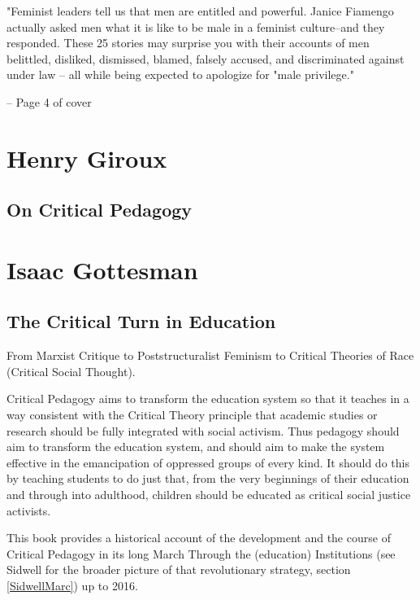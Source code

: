 \documentclass[10pt,titlepage]{book}
\begin{document}
"Feminist leaders tell us that men are entitled and powerful. Janice Fiamengo actually asked men what it is like to be male in a feminist culture--and they responded.
These 25 stories may surprise you with their accounts of men belittled, disliked, dismissed, blamed, falsely accused, and discriminated against under law -- all while being expected to apologize for "male privilege."

-- Page 4 of cover


\section{Henry Giroux}\label{GirouxHenry}

\subsection{On Critical Pedagogy \cite{giroux-critped}}

\pagebreak

\section{Isaac Gottesman}\label{GottesmanIsaac}

\subsection{The Critical Turn in Education \cite{gottesman-criturn}}

From Marxist Critique to Poststructuralist Feminism to Critical Theories of Race (Critical Social Thought).

Critical Pedagogy aims to transform the education system so that it teaches in a way consistent with the Critical Theory principle that academic studies or research should be fully integrated with social activism.
Thus pedagogy should aim to transform the education system, and should aim to make the system effective in the emancipation of oppressed groups of every kind.
It should do this by teaching students to do just that, from the very beginnings of their education and through into adulthood, children should be educated as critical social justice activists.

This book provides a historical account of the development and the course of Critical Pedagogy in its long March Through the (education) Institutions (see Sidwell for the broader picture of that revolutionary strategy, section \ref{SidwellMarc}) up to 2016.
\end{document}
